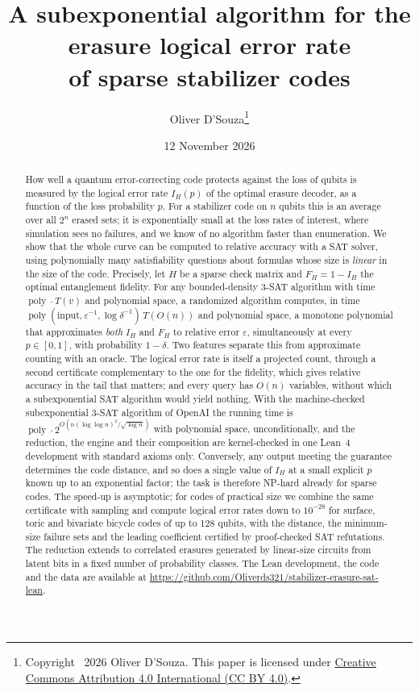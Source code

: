 \documentclass[11pt]{article}
\title{A subexponential algorithm for the erasure logical error rate\\
of sparse stabilizer codes}
\author{Oliver D'Souza\thanks{Copyright \textcopyright\ 2026 Oliver D'Souza.
This paper is licensed under
\href{https://creativecommons.org/licenses/by/4.0/}{Creative Commons Attribution 4.0 International (CC BY 4.0)}.}}
\date{\small 12 November 2026}
\theoremstyle{remark}
\newcommand{\poly}{\operatorname{poly}}
\newcommand{\eps}{\varepsilon}
\begin{document}
\maketitle
\vspace{-1.8em}
\begin{abstract}
How well a quantum error-correcting code protects against the loss of
qubits is measured by the logical error rate \(I_H(p)\) of the optimal
erasure decoder, as a function of the loss probability \(p\). For a
stabilizer code on \(n\) qubits this is an average over all \(2^n\)
erased sets; it is exponentially small at the loss rates of interest,
where simulation sees no failures, and we know of no algorithm faster
than enumeration. We show that the whole curve can be computed to
relative accuracy with a SAT solver, using polynomially many
satisfiability questions about formulas whose size is \emph{linear} in
the size of the code. Precisely, let \(H\) be a sparse check matrix and
\(F_H=1-I_H\) the optimal entanglement fidelity. For any bounded-density
3-SAT algorithm with time \(\poly\cdot T(v)\) and polynomial space, a
randomized algorithm computes, in time
\(\poly(\mathrm{input},\eps^{-1},\log\delta^{-1})\,T(O(n))\) and
polynomial space, a monotone polynomial that approximates \emph{both}
\(I_H\) and \(F_H\) to relative error \(\eps\), simultaneously at every
\(p\in[0,1]\), with probability \(1-\delta\). Two features separate this
from approximate counting with an oracle. The logical error rate is
itself a projected count, through a second certificate complementary to
the one for the fidelity, which gives relative accuracy in the tail that
matters; and every query has \(O(n)\) variables, without which a
subexponential SAT algorithm would yield nothing. With the
machine-checked subexponential 3-SAT algorithm of OpenAI the running
time is \(\poly\cdot2^{O(n(\log\log n)^2/\sqrt{\log n})}\) with polynomial
space, unconditionally, and the reduction, the engine and their
composition are kernel-checked in one Lean~4 development with standard
axioms only. Conversely, any
output meeting the guarantee determines the code distance, and so does a
single value of \(I_H\) at a small explicit \(p\) known up to an
exponential factor; the task is therefore NP-hard already for sparse
codes. The speed-up is asymptotic; for codes of practical size we
combine the same certificate
with sampling and compute logical error rates down to \(10^{-28}\) for
surface, toric and bivariate bicycle codes of up to 128 qubits, with
the distance, the minimum-size failure sets and the leading coefficient
certified by proof-checked SAT refutations. The reduction extends to
correlated erasures generated by linear-size circuits from latent bits
in a fixed number of probability classes. The Lean development, the
code and the data are available at
\url{https://github.com/Oliverds321/stabilizer-erasure-sat-lean}.
\end{abstract}
\end{document}

